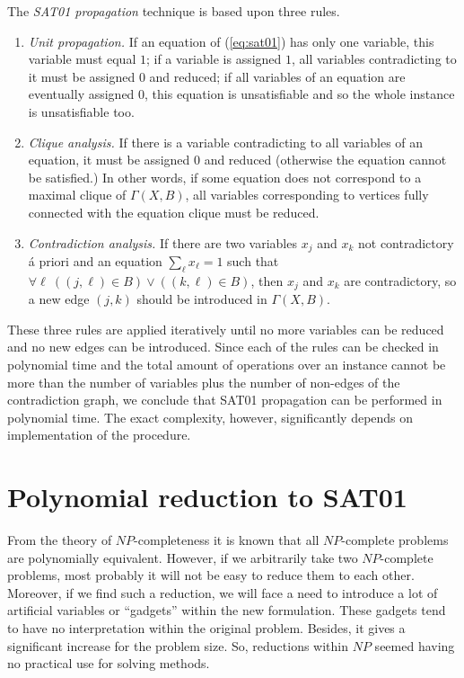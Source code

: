 \documentclass[11pt]{article}
\begin{document}
The {\em SAT01 propagation\/} technique is based upon three rules.
\begin{enumerate}
\item {\em Unit propagation.\/} If an equation of (\ref{eq:sat01}) has only one variable, this variable must equal $1$; if a variable is assigned $1$, all variables contradicting to it must be assigned $0$ and reduced; if all variables of an equation are eventually assigned $0$, this equation is unsatisfiable and so the whole instance is unsatisfiable too.
\item {\em Clique analysis.\/} If there is a variable contradicting to all variables of an equation, it must be assigned $0$ and reduced (otherwise the equation cannot be satisfied.) In other words, if some equation does not correspond to a maximal clique of $\Gamma(X,B)$, all variables corresponding to vertices fully connected with the equation clique must be reduced.
\item {\em Contradiction analysis.\/} If there are two variables $x_j$ and $x_k$ not contradictory \'a priori and an equation $\sum_{\ell} x_{\ell}=1$ such that $\forall \ell \ ((j,\ell) \in B) \lor ((k,\ell) \in B)$, then $x_j$ and $x_k$ are contradictory, so a new edge $(j,k)$ should be introduced in $\Gamma(X,B)$.
\end{enumerate}
These three rules are applied iteratively until no more variables can be reduced and no new edges can be introduced. Since each of the rules can be checked in polynomial time and the total amount of operations over an instance cannot be more than the number of variables plus the number of non-edges of the contradiction graph, we conclude that SAT01 propagation can be performed in polynomial time. The exact complexity, however, significantly depends on implementation of the procedure.

\section{Polynomial reduction to SAT01}
From the theory of $NP$-completeness it is known that all $NP$-complete problems
are polynomially equivalent. However, if we arbitrarily take two $NP$-complete
problems, most probably it will not be easy to reduce them to each other. Moreover, if we find such a reduction, we will face a need to introduce a lot of artificial variables or ``gadgets'' within the new formulation. These gadgets tend to have no interpretation within the original problem. Besides, it gives a significant increase for the problem size. So, reductions within $NP$ seemed having no practical use for solving methods.
\end{document}
